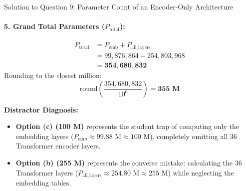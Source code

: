 \documentclass[11pt,a4paper]{article}
\begin{document}
\begin{solutionbox}{Solution to Question 9: Parameter Count of an Encoder-Only Architecture}
\paragraph{5. Grand Total Parameters ($P_{\text{total}}$):}
\begin{align}
    P_{\text{total}} &= P_{\text{emb}} + P_{\text{all\_layers}} \nonumber\\
    &= 99,876,864 + 254,803,968 \nonumber\\
    &= \mathbf{354,680,832}
\end{align}
Rounding to the closest million:
\begin{equation}
    \text{round}\left(\frac{354,680,832}{10^6}\right) = \mathbf{355\text{ M}}
\end{equation}

\medskip
\textbf{Distractor Diagnosis:}
\begin{itemize}[leftmargin=1.8em]
    \item \textbf{Option (c) (100 M)} represents the student trap of computing only the embedding layers ($P_{\text{emb}} \approx 99.88\text{ M} \approx 100\text{ M}$), completely omitting all 36 Transformer encoder layers.
    \item \textbf{Option (b) (255 M)} represents the converse mistake: calculating the 36 Transformer layers ($P_{\text{all\_layers}} \approx 254.80\text{ M} \approx 255\text{ M}$) while neglecting the embedding tables.
\end{itemize}
\end{solutionbox}

\newpage
\end{document}
